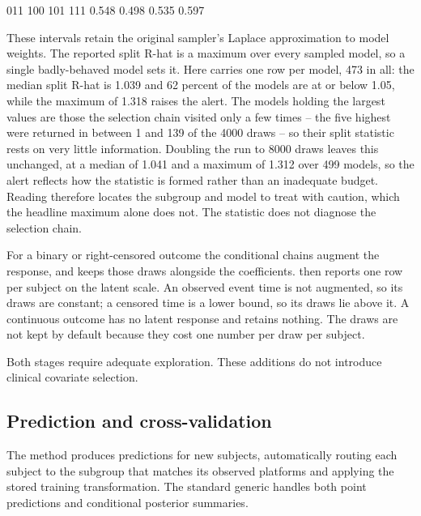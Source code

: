 \documentclass[article]{jss}
\begin{document}
{\begin{CodeChunk}
\begin{CodeOutput}
  011   100   101   111 
0.548 0.498 0.535 0.597 
\end{CodeOutput}
\end{CodeChunk}

These intervals retain the original sampler's Laplace approximation to model
weights. The reported split R-hat is a maximum over every sampled model, so a
single badly-behaved model sets it. Here  carries one
row per model, 473 in all: the median split R-hat is 1.039 and 62 percent of
the models are at or below 1.05, while the maximum of 1.318 raises the alert.
The models holding the largest values are those the selection chain visited
only a few times -- the five highest were returned in between 1 and 139 of the
4000 draws -- so their split statistic rests on very little information.
Doubling the run to 8000 draws leaves this unchanged, at a median of 1.041 and
a maximum of 1.312 over 499 models, so the alert reflects how the statistic is
formed rather than an inadequate budget.
Reading  therefore locates the subgroup and model to
treat with caution, which the headline maximum alone does not. The statistic
does not diagnose the selection chain.

For a binary or right-censored outcome the conditional chains augment the
response, and  keeps those draws
alongside the coefficients.  then reports
one row per subject on the latent scale. An observed event time is not
augmented, so its draws are constant; a censored time is a lower bound, so its
draws lie above it. A continuous outcome has no latent response and retains
nothing. The draws are not kept by default because they cost one number per
draw per subject.
}%
Both stages require adequate exploration. These additions do not introduce
clinical covariate selection.

\subsection{Prediction and cross-validation}\label{sec:predict}

The  method produces predictions for new subjects, automatically
routing each subject to the subgroup that matches its observed platforms and
applying the stored training transformation. The standard 
generic handles both point predictions and conditional posterior summaries.
\end{document}
